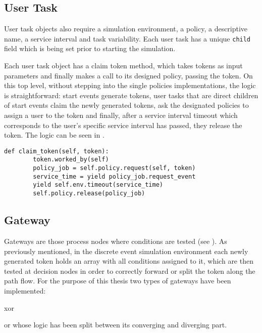 \subsection{User Task}
\label{subsec:user_task}

User task objects also require a simulation environment, a policy, a descriptive name, a service interval and task variability. Each user task has a unique \texttt{child} field which is being set prior to starting the simulation.

Each user task object has a claim token method, which takes tokens as input parameters and finally makes a call to its designed policy, passing the token. On this top level, without stepping into the single policies implementations, the logic is straightforward: start events generate tokens, user tasks that are direct children of start events claim the newly generated tokens, ask the designated policies to assign a user to the token and finally, after a service interval timeout which corresponds to the user's specific service interval has passed, they release the token. The logic can be seen in .

\begin{lstlisting}[caption=User task claim method,label=lst:user_task,style=CustomPython]
    def claim_token(self, token):
        token.worked_by(self)
        policy_job = self.policy.request(self, token)
        service_time = yield policy_job.request_event
        yield self.env.timeout(service_time)
        self.policy.release(policy_job)
\end{lstlisting}

\subsection{Gateway}

Gateways are those process nodes where conditions are tested (see ). As previously mentioned, in the discrete event simulation environment each newly generated token holds an array with all conditions assigned to it, which are then tested at decision nodes in order to correctly forward or split the token along the path flow. For the purpose of this thesis two types of gateways have been implemented:
\begin{enumerate*}
     \item \gls{xor}
     \item \gls{or} whose logic has been split between its converging and diverging part.
 \end{enumerate*} 

